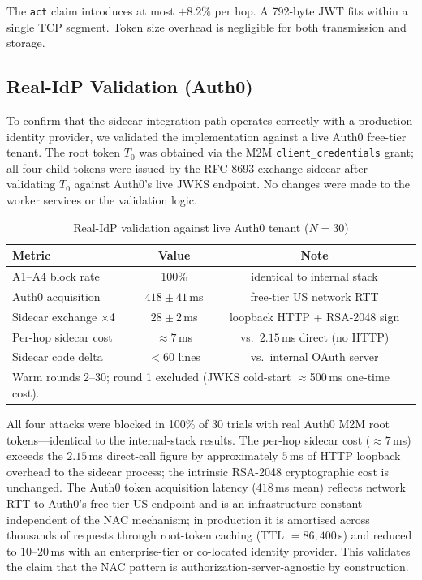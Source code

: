 \documentclass[journal]{IEEEtran}
\begin{document}
The \texttt{act} claim introduces at most $+8.2\%$ per hop. A 792-byte JWT
fits within a single TCP segment. Token size overhead is negligible for both
transmission and storage.


\subsection{Real-IdP Validation (Auth0)}
\label{sec:auth0_validation}

To confirm that the sidecar integration path operates correctly with a
production identity provider, we validated the implementation against a live
Auth0 free-tier tenant. The root token $T_0$ was obtained via the M2M
\texttt{client\_credentials} grant; all four child tokens were issued by the
RFC 8693 exchange sidecar after validating $T_0$ against Auth0's live JWKS
endpoint. No changes were made to the worker services or the validation logic.

\begin{table}[h]
\caption{Real-IdP validation against live Auth0 tenant ($N=30$)}
\label{tab:auth0}
\centering
\footnotesize
\setlength{\tabcolsep}{4pt}
\begin{tabular}{lcc}
\toprule
\textbf{Metric} & \textbf{Value} & \textbf{Note} \\
\midrule
A1--A4 block rate    & 100\%              & identical to internal stack \\
Auth0 acquisition    & $418 \pm 41$\,ms   & free-tier US network RTT \\
Sidecar exchange ×4  & $28 \pm 2$\,ms     & loopback HTTP + RSA-2048 sign \\
Per-hop sidecar cost & $\approx 7$\,ms    & vs.\ $2.15$\,ms direct (no HTTP) \\
Sidecar code delta   & $<60$ lines        & vs.\ internal OAuth server \\
\bottomrule
\multicolumn{3}{l}{\scriptsize Warm rounds 2--30; round 1 excluded (JWKS cold-start
  $\approx$500\,ms one-time cost).}
\end{tabular}
\end{table}

All four attacks were blocked in 100\% of 30 trials with real Auth0 M2M root
tokens---identical to the internal-stack results. The per-hop sidecar cost
($\approx 7$\,ms) exceeds the $2.15$\,ms direct-call figure by approximately
$5$\,ms of HTTP loopback overhead to the sidecar process; the intrinsic
RSA-2048 cryptographic cost is unchanged. The Auth0 token acquisition latency
($418$\,ms mean) reflects network RTT to Auth0's free-tier US endpoint and is
an infrastructure constant independent of the NAC mechanism; in production it is
amortised across thousands of requests through root-token caching (TTL
$=86{,}400$\,s) and reduced to $10$--$20$\,ms with an enterprise-tier or
co-located identity provider. This validates the claim that the NAC pattern is
authorization-server-agnostic by construction.
\end{document}
